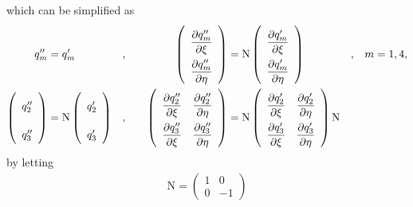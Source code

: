 \documentclass[a4paper,12pt,dvips]{article}
\begin{document}
which can be simplified as
\begin{alignat}{4}
\renewcommand{\arraystretch}{2.2}
\begin{aligned}
  q''_m &= q'_m&,& \quad
  &\left(\begin{array}{c}
    \dfrac{\partial q''_m}{\partial\xi} \\
    \dfrac{\partial q''_m}{\partial\eta}
  \end{array}\right)
  &= \mathrm{N} \left(\begin{array}{c}
    \dfrac{\partial q'_m}{\partial\xi} \\
    \dfrac{\partial q'_m}{\partial\eta}
  \end{array}\right)&,& \quad m = 1, 4, \\
  \left(\begin{array}{c}
    q''_2 \\ q''_3
  \end{array}\right)
  &= \mathrm{N} \left(\begin{array}{c}
    q'_2 \\ q'_3
  \end{array}\right)&,& \quad
  &\left(\begin{array}{cc}
    \dfrac{\partial q''_2}{\partial\xi} &
    \dfrac{\partial q''_2}{\partial\eta} \\
    \dfrac{\partial q''_3}{\partial\xi} &
    \dfrac{\partial q''_3}{\partial\eta}
  \end{array}\right)
  &= \mathrm{N} \left(\begin{array}{cc}
    \dfrac{\partial q'_2}{\partial\xi} &
    \dfrac{\partial q'_2}{\partial\eta} \\
    \dfrac{\partial q'_3}{\partial\xi} &
    \dfrac{\partial q'_3}{\partial\eta}
  \end{array}\right) \mathrm{N}&&
\end{aligned} \label{e:reflection_euler_2d_local}
\end{alignat}
by letting
\begin{align*}
  \mathrm{N} = \left(\begin{array}{cc}
    1 & 0 \\ 0 & -1
  \end{array}\right)
\end{align*}
\end{document}
